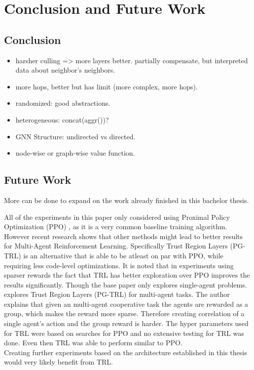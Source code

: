 
\chapter{Conclusion and Future Work}
\label{ch:Conclusion}

\section{Conclusion}
\begin{itemize}[noitemsep,nolistsep]
	\item harsher culling => more layers better. partially compensate, but interpreted data about neighbor's neighbors.
	\item more hops, better but has limit (more complex, more hops).
	\item randomized: good abstractions.
	\item heterogeneous: concat(aggr())?
	\item GNN Structure: undirected vs directed.
	\item node-wise or graph-wise value function.
\end{itemize}


\section{Future Work}
More can be done to expand on the work already finished in this bachelor thesis.\par

All of the experiments in this paper only considered using Proximal Policy Optimization (PPO) \citet{SchulmanWDRK17}, as it is a very common baseline training algorithm.
However recent research shows that other methods might lead to better results for Multi-Agent Reinforcement Learning.
Specifically Trust Region Layers (PG-TRL) \citet{otto2021differentiable} is an alternative that is able to be atleast on par with PPO, while requiring less code-level optimizations. It is noted that in experiments using sparser rewards the fact that TRL has better exploration over PPO improves the results significantly. Though the base paper only explores single-agent problems.
\citet{RobinRuede2021} explores Trust Region Layers (PG-TRL) \citet{otto2021differentiable} for multi-agent tasks. The author explains that given an multi-agent cooperative task the agents are rewarded as a group, which makes the reward more sparse. Therefore creating correlation of a single agent's action and the group reward is harder. The hyper parameters used for TRL were based on searches for PPO and no extensive testing for TRL was done. Even then TRL was able to perform similar to PPO.\\
Creating further experiments based on the architecture established in this thesis would very likely benefit from TRL. \par

